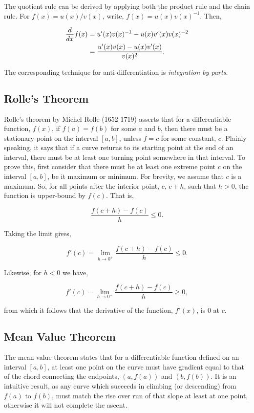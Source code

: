 \documentclass[11pt]{amsart}
\begin{document}
The quotient rule can be derived by applying both the product rule and the chain rule. For $f(x) = u(x) / v(x)$, write, $f(x) = u(x)v(x)^{-1}$. Then, 

\begin{align}
\frac{\mathop{d}}{\mathop{dx}}f(x) &= u'(x)v(x)^{-1} - u(x)v'(x)v(x)^{-2} \notag \\
&= \frac{u'(x)v(x) - u(x)v'(x)}{v(x)^2}. \notag
\end{align}

The corresponding technique for anti-differentiation is \emph{integration by parts}.

\subsection{Rolle's Theorem}

Rolle's theorem by Michel Rolle (1652-1719) asserts that for a differentiable function, $f(x)$, if $f(a) = f(b)$ for some $a$ and $b$, then there must be a stationary point on the interval $[a, b]$, unless $f = c$ for some constant, $c$. Plainly speaking, it says that if a curve returns to its starting point at the end of an interval, there must be at least one turning point somewhere in that interval. To prove this, first consider that there must be at least one extreme point $c$ on the interval $[a, b]$, be it maximum or minimum. For brevity, we assume that $c$ is a maximum. So, for all points after the interior point, $c$, $c + h$, such that $h > 0$, the function is upper-bound by $f(c)$. That is,

$$\frac{f(c + h) - f(c)}{h} \leq 0.$$

Taking the limit gives,

$$f'(c) = \lim_{h \to 0^+} \frac{f(c + h) - f(c)}{h} \leq 0.$$

Likewise, for $h < 0$ we have,

$$f'(c) = \lim_{h \to 0^-} \frac{f(c + h) - f(c)}{h} \geq 0,$$

from which it follows that the derivative of the function, $f'(x)$, is 0 at $c$.

\subsection{Mean Value Theorem}

The mean value theorem states that for a differentiable function defined on an interval $[a, b]$, at least one point on the curve must have gradient equal to that of the chord connecting the endpoints, $(a, f(a))$ and $(b, f(b))$. It is an intuitive result, as any curve which succeeds in climbing (or descending) from $f(a)$ to $f(b)$, must match the rise over run of that slope at least at one point, otherwise it will not complete the ascent.
\end{document}
